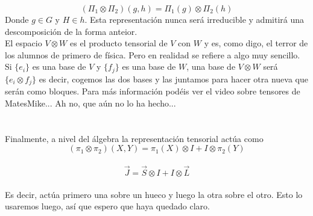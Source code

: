 \documentclass[12pt]{article}
\begin{document}
$$(\Pi_1 \otimes \Pi_2)(g,h)=\Pi_1(g) \otimes \Pi_2(h)$$
Donde $g\in G$ y $H\in h$. Esta representación nunca será irreducible y admitirá una descomposición de la forma anteior.\\
El espacio $V\otimes W$ es el producto tensorial de $V$ con $W$ y es, como digo, el terror de los alumnos de primero de física. Pero en realidad se refiere a algo muy sencillo. Si $\{e_i\}$ es una base de $V$ y $\{f_j\}$ es una base de $W$, una base de $V\otimes W$ será $\{e_i \otimes f_j\}$ es decir, cogemos las dos bases y las juntamos para hacer otra nueva que serán como bloques. Para más información podéis ver el video sobre tensores de MatesMike... Ah no, que aún no lo ha hecho...\\\\
\\ Finalmente, a nivel del álgebra la representación tensorial actúa como 
$$(\pi_1\otimes \pi_2)(X,Y)=\pi_1(X)\otimes I+I\otimes\pi_2(Y)$$
\\
$$\vec J =\vec S \otimes I+I\otimes\vec L$$
\\
Es decir, actúa primero una sobre un hueco y luego la otra sobre el otro. Esto lo usaremos luego, así que espero que haya quedado claro. 
\end{document}
